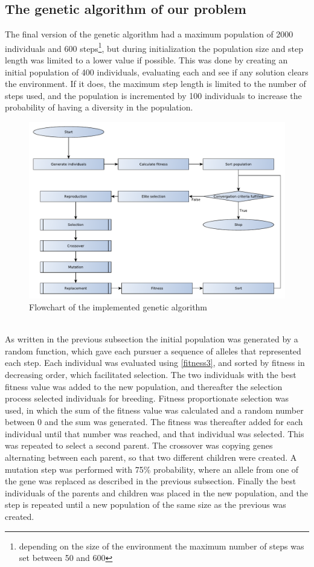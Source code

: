 \subsection{The genetic algorithm of our problem}
The final version of the genetic algorithm had a maximum population of 2000 individuals and 600 steps\footnote{depending on the size of the environment the maximum number of steps was set between 50 and 600 }, but during initialization the population size and step length was limited to a lower value if possible. This was done by creating an initial population of 400 individuals, evaluating each and see if any solution clears the environment. If it does, the maximum step length is limited to the number of steps used, and the population is incremented by 100 individuals to increase the probability of having a diversity in the population.
\begin{figure}[!h]
	\centering
	\includegraphics[width=\textwidth]{chapter_4_methods/GeneticFlowChart-Algorithm}
	\caption[Flowchart of the implemented genetic algorithm]
	{Flowchart of the implemented genetic algorithm}
\end{figure}
\\As written in the previous subsection the initial population was generated by a random function, which gave each pursuer a sequence of alleles that represented each step.
Each individual was evaluated using \eqref{fitness3}, and sorted by fitness in decreasing order, which facilitated selection.
The two individuals with the best fitness value was added to the new population, and thereafter the selection process selected individuals for breeding. Fitness proportionate selection was used, in which the sum of the fitness value was calculated and a random number between 0 and the sum was generated. The fitness was thereafter added for each individual until that number was reached, and that individual was selected. This was repeated to select a second parent. The crossover was copying genes alternating between each parent, so that two different children were created. A mutation step was performed with 75\% probability, where an allele from one of the gene was replaced as described in the previous subsection. Finally the best individuals of the parents and children was  placed in the new population, and the step is repeated until a new population of the same size as the previous was created.
